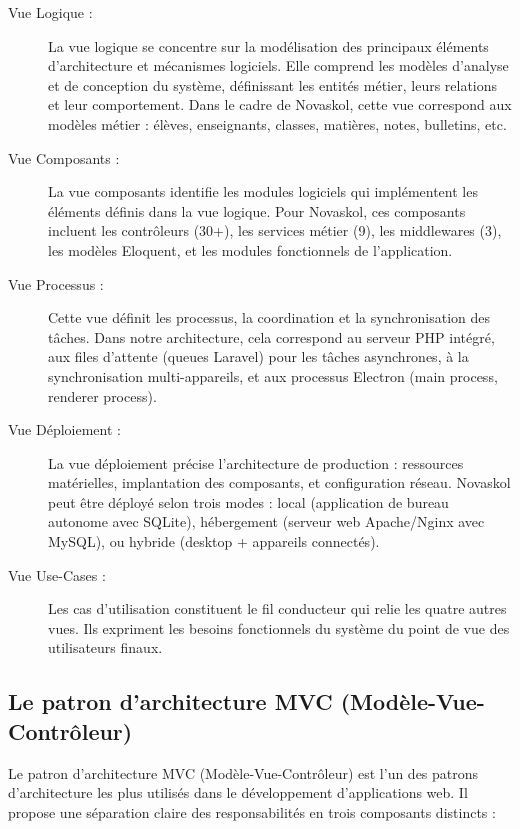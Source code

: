 \documentclass[12pt,a4paper,twoside]{report}
\begin{document}
\begin{description}
    \item[Vue Logique :] La vue logique se concentre sur la modélisation des principaux éléments d'architecture et mécanismes logiciels. Elle comprend les modèles d'analyse et de conception du système, définissant les entités métier, leurs relations et leur comportement. Dans le cadre de Novaskol, cette vue correspond aux modèles métier : élèves, enseignants, classes, matières, notes, bulletins, etc.
    \item[Vue Composants :] La vue composants identifie les modules logiciels qui implémentent les éléments définis dans la vue logique. Pour Novaskol, ces composants incluent les contrôleurs (30+), les services métier (9), les middlewares (3), les modèles Eloquent, et les modules fonctionnels de l'application.
    \item[Vue Processus :] Cette vue définit les processus, la coordination et la synchronisation des tâches. Dans notre architecture, cela correspond au serveur PHP intégré, aux files d'attente (queues Laravel) pour les tâches asynchrones, à la synchronisation multi-appareils, et aux processus Electron (main process, renderer process).
    \item[Vue Déploiement :] La vue déploiement précise l'architecture de production : ressources matérielles, implantation des composants, et configuration réseau. Novaskol peut être déployé selon trois modes : local (application de bureau autonome avec SQLite), hébergement (serveur web Apache/Nginx avec MySQL), ou hybride (desktop + appareils connectés).
    \item[Vue Use-Cases :] Les cas d'utilisation constituent le fil conducteur qui relie les quatre autres vues. Ils expriment les besoins fonctionnels du système du point de vue des utilisateurs finaux.
\end{description}

\subsection{Le patron d'architecture MVC (Modèle-Vue-Contrôleur)}

Le patron d'architecture MVC (Modèle-Vue-Contrôleur) est l'un des patrons d'architecture les plus utilisés dans le développement d'applications web. Il propose une séparation claire des responsabilités en trois composants distincts :
\end{document}
